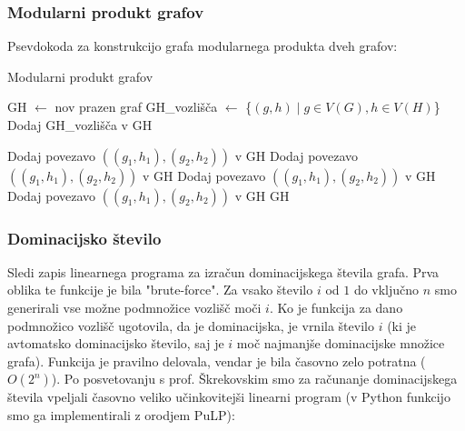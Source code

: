 \documentclass[a4paper,12pt]{article}
\theoremstyle{definition}
\begin{document}
\subsubsection{Modularni produkt grafov}
Psevdokoda za konstrukcijo grafa modularnega produkta dveh grafov:
\begin{algorithm}
\caption{Modularni produkt grafov}
\begin{algorithmic}[1]
    \State GH $\gets$ nov prazen graf
    \State GH\_vozlišča $\gets$ \{$(g, h) \mid g \in V(G), h \in V(H)$\} 
    \State Dodaj GH\_vozlišča v GH
    
     
                \State Dodaj povezavo $((g_1, h_1), (g_2, h_2))$ v GH
                \State Dodaj povezavo $((g_1, h_1), (g_2, h_2))$ v GH
                \State Dodaj povezavo $((g_1, h_1), (g_2, h_2))$ v GH
                \State Dodaj povezavo $((g_1, h_1), (g_2, h_2))$ v GH
            \EndIf
        \EndFor
    \EndFor
    \State \Return GH 
\EndFunction
\end{algorithmic}
\end{algorithm}

\subsubsection{Dominacijsko število}
\noindent Sledi zapis linearnega programa za izračun dominacijskega števila grafa. Prva oblika te funkcije je bila "brute-force". Za vsako število $i$ od $1$ do vključno $n$ smo generirali vse možne podmnožice vozlišč moči $i$. Ko je funkcija za dano podmnožico vozlišč ugotovila, da je dominacijska, je vrnila število $i$ (ki je avtomatsko dominacijsko število, saj je $i$ moč najmanjše dominacijske množice grafa). Funkcija je pravilno delovala, vendar je bila časovno zelo potratna ($O(2^n)$). Po posvetovanju s prof. Škrekovskim smo za računanje dominacijskega števila vpeljali časovno veliko učinkovitejši linearni program (v Python funkcijo smo ga implementirali z orodjem PuLP):
\end{document}
